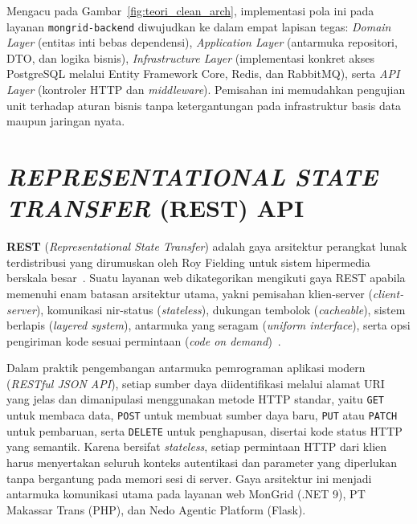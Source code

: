 Mengacu pada Gambar~\ref{fig:teori_clean_arch}, implementasi pola ini pada layanan \texttt{mongrid-backend} diwujudkan ke dalam empat lapisan tegas: \textit{Domain Layer} (entitas inti bebas dependensi), \textit{Application Layer} (antarmuka repositori, DTO, dan logika bisnis), \textit{Infrastructure Layer} (implementasi konkret akses PostgreSQL melalui Entity Framework Core, Redis, dan RabbitMQ), serta \textit{API Layer} (kontroler HTTP dan \textit{middleware}). Pemisahan ini memudahkan pengujian unit terhadap aturan bisnis tanpa ketergantungan pada infrastruktur basis data maupun jaringan nyata.

\section{\textit{REPRESENTATIONAL STATE TRANSFER} (REST) API}

\textbf{REST} (\textit{Representational State Transfer}) adalah gaya arsitektur perangkat lunak terdistribusi yang dirumuskan oleh Roy Fielding untuk sistem hipermedia berskala besar~\cite{fielding2000architectural}. Suatu layanan web dikategorikan mengikuti gaya REST apabila memenuhi enam batasan arsitektur utama, yakni pemisahan klien-server (\textit{client-server}), komunikasi nir-status (\textit{stateless}), dukungan tembolok (\textit{cacheable}), sistem berlapis (\textit{layered system}), antarmuka yang seragam (\textit{uniform interface}), serta opsi pengiriman kode sesuai permintaan (\textit{code on demand})~\cite{fielding2000architectural}.

Dalam praktik pengembangan antarmuka pemrograman aplikasi modern (\textit{RESTful JSON API}), setiap sumber daya diidentifikasi melalui alamat URI yang jelas dan dimanipulasi menggunakan metode HTTP standar, yaitu \texttt{GET} untuk membaca data, \texttt{POST} untuk membuat sumber daya baru, \texttt{PUT} atau \texttt{PATCH} untuk pembaruan, serta \texttt{DELETE} untuk penghapusan, disertai kode status HTTP yang semantik. Karena bersifat \textit{stateless}, setiap permintaan HTTP dari klien harus menyertakan seluruh konteks autentikasi dan parameter yang diperlukan tanpa bergantung pada memori sesi di server. Gaya arsitektur ini menjadi antarmuka komunikasi utama pada layanan web MonGrid (.NET 9), PT Makassar Trans (PHP), dan Nedo Agentic Platform (Flask).

